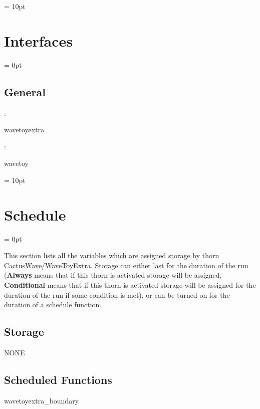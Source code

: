 \documentclass{article}
\begin{document}
\vspace{0.5cm}\parskip = 10pt 

\section{Interfaces} 


\parskip = 0pt

\vspace{3mm} \subsection*{General}

: 

wavetoyextra
\vspace{2mm}

: 

wavetoy
\vspace{2mm}

\vspace{5mm}\parskip = 10pt 

\section{Schedule} 


\parskip = 0pt


\noindent This section lists all the variables which are assigned storage by thorn CactusWave/WaveToyExtra.  Storage can either last for the duration of the run ({\bf Always} means that if this thorn is activated storage will be assigned, {\bf Conditional} means that if this thorn is activated storage will be assigned for the duration of the run if some condition is met), or can be turned on for the duration of a schedule function.


\subsection*{Storage}NONE
\subsection*{Scheduled Functions}
\vspace{5mm}


\hspace{5mm} wavetoyextra\_boundary 

\hspace{5mm}{\it additional boundary conditions for 3d wave equation } 
\end{document}
